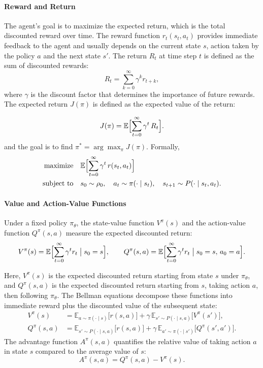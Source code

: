 \paragraph{Reward and Return}
The agent's goal is to maximize the expected return, which is the total discounted reward over time. 
The reward function \(r_t(s_t,a_t)\) provides immediate feedback to the agent and usually depends on the current state \(s\), action taken by the policy \(a\) and the next state \(s'\). The return \(R_t\) at time step \(t\) is defined as the sum of discounted rewards:
\[
R_t = \sum_{k=0}^{\infty} \gamma^k r_{t+k},
\]
where \(\gamma\) is the discount factor that determines the importance of future rewards. The expected return \(J(\pi)\) is defined as the expected value of the return:

\[
J(\pi) = \mathbb{E}\Bigl[\sum_{t=0}^\infty \gamma^t\,R_t\Bigr].
\]
and the goal is to find \(\pi^* = \arg\max_\pi J(\pi)\). Formally,
\begin{equation}\label{eq:RL_opt}
\begin{aligned}
\text{maximize} \quad & \mathbb{E}\Bigl[\sum_{t=0}^\infty \gamma^t\,r(s_t,a_t)\Bigr] \\
\text{subject to} \quad & s_0 \sim \rho_0, \quad a_t \sim \pi(\cdot\mid s_t), \quad s_{t+1} \sim P(\cdot\mid s_t,a_t).
\end{aligned}
\end{equation}

\paragraph{Value and Action-Value Functions}
Under a fixed policy \(\pi_\theta\), the state-value function \(V^\pi(s)\) and the action-value function \(Q^\pi(s,a)\) measure the expected discounted return:
\[
V^\pi(s) = \mathbb{E}\Bigl[\sum_{t=0}^\infty \gamma^t r_t \;\big|\; s_0 = s\Bigr], 
\qquad
Q^\pi(s,a) = \mathbb{E}\Bigl[\sum_{t=0}^\infty \gamma^t r_t \;\big|\; s_0 = s,\,a_0 = a\Bigr].
\]

Here, \(V^\pi(s)\) is the expected discounted return starting from state \(s\) under \(\pi_\theta\), and \(Q^\pi(s,a)\) is the expected discounted return starting from \(s\), taking action \(a\), then following \(\pi_\theta\).
The Bellman equations decompose these functions into immediate reward plus the discounted value of the subsequent state:
\begin{align}
V^\pi(s)
&= \mathbb{E}_{a\sim\pi(\cdot\mid s)}\bigl[r(s,a)\bigr]
  + \gamma\,\mathbb{E}_{s'\sim P(\cdot\mid s,a)}\bigl[V^\pi(s')\bigr],\\
Q^\pi(s,a)
&= \mathbb{E}_{s'\sim P(\cdot\mid s,a)}\bigl[r(s,a)\bigr]
  + \gamma\,\mathbb{E}_{a'\sim\pi(\cdot\mid s')}\bigl[Q^\pi(s',a')\bigr].
\end{align}
The advantage function \(A^\pi(s,a)\) quantifies the relative value of taking action \(a\) in state \(s\) compared to the average value of \(s\):
\[
A^\pi(s,a) = Q^\pi(s,a) - V^\pi(s).
\]

